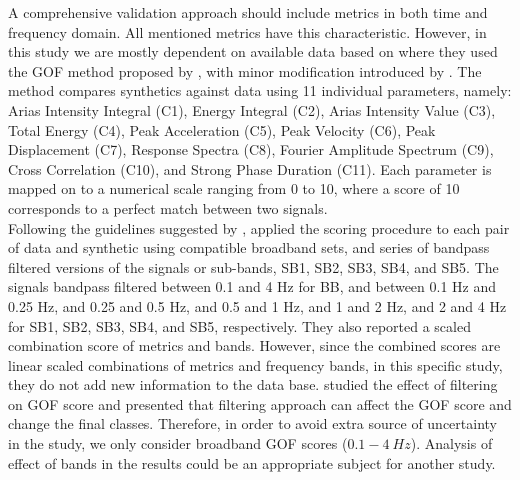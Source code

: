 A comprehensive validation approach should include metrics in both time and frequency domain. All mentioned metrics \citep[i.e.,][]{Anderson_2004_Proc,Kristekova_2006_BSSA,Kristekova_2009_GJI,Olsen_2010_SRL} have this characteristic. However, in this study we are mostly dependent on available data based on \citet{Taborda_2014_BSSA} where they used the GOF method proposed by \citet{Anderson_2004_Proc}, with minor modification introduced by \citet{Taborda_2013_BSSA}. The method compares synthetics against data using 11 individual parameters, namely: Arias Intensity Integral (C1), Energy Integral (C2), Arias Intensity Value (C3), Total Energy (C4), Peak Acceleration (C5), Peak Velocity (C6), Peak Displacement (C7), Response Spectra (C8), Fourier Amplitude Spectrum (C9), Cross Correlation (C10), and Strong Phase Duration (C11). Each parameter is mapped on to a numerical scale ranging from 0 to 10, where a score of 10 corresponds to a perfect  match between two signals.\\
Following the guidelines suggested by \citet{Anderson_2004_Proc}, \citet{Taborda_2014_BSSA} applied the scoring procedure to each pair of data and synthetic using compatible broadband sets, and series of bandpass filtered versions of the signals or sub-bands, SB1, SB2, SB3, SB4, and SB5. The signals bandpass filtered between 0.1 and 4 Hz for BB, and between 0.1 Hz and 0.25 Hz, and 0.25 and 0.5 Hz, and 0.5 and 1 Hz, and 1 and 2 Hz, and 2 and 4 Hz for SB1, SB2, SB3, SB4, and SB5, respectively. They also reported a scaled combination score of metrics and bands. However, since the combined scores are linear scaled combinations of metrics and frequency bands, in this specific study, they do not add new information to the data base.  \citet{Khoshnevis_2015_Proc} studied the effect of filtering on GOF score and presented that filtering approach can affect the GOF score and change the final classes. Therefore, in order to avoid extra source of uncertainty in the study, we only consider broadband GOF scores ($0.1-4~Hz$). Analysis of effect of bands in the results could be an appropriate subject for another study. 










